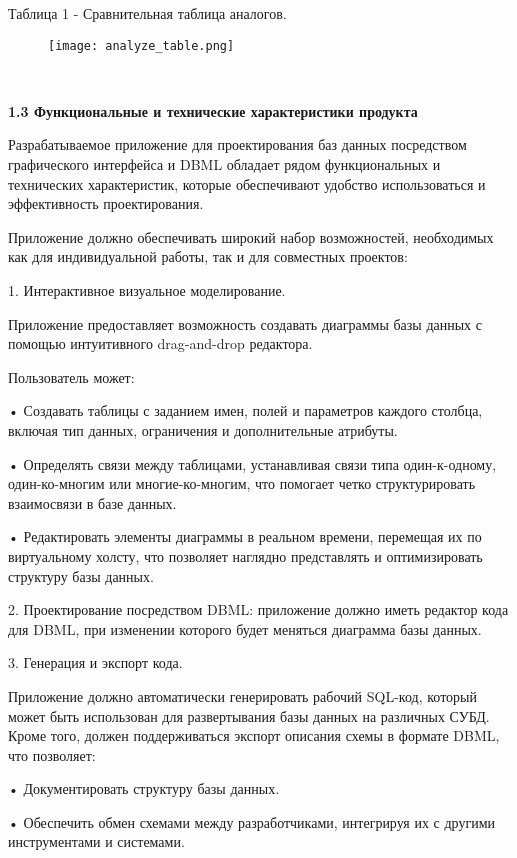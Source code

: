 \newpage
Таблица 1 - Сравнительная таблица аналогов.
\begin{figure}[htbp]
    \centering 
    \texttt{[image: analyze\_table.png]} 
\end{figure}

\

\textbf{\large 1.3 Функциональные и технические характеристики продукта}

Разрабатываемое приложение для проектирования баз данных посредством графического интерфейса и DBML обладает рядом функциональных и технических характеристик, которые обеспечивают удобство использоваться и эффективность проектирования.

Приложение должно обеспечивать широкий набор возможностей, необходимых как для индивидуальной работы, так и для совместных проектов:

1. Интерактивное визуальное моделирование.

Приложение предоставляет возможность создавать диаграммы базы данных с помощью интуитивного drag-and-drop редактора.

Пользователь может:

• Создавать таблицы с заданием имен, полей и параметров каждого столбца, включая тип данных, ограничения и дополнительные атрибуты.

• Определять связи между таблицами, устанавливая связи типа один-к-одному, один-ко-многим или многие-ко-многим, что помогает четко структурировать взаимосвязи в базе данных.

• Редактировать элементы диаграммы в реальном времени, перемещая их по виртуальному холсту, что позволяет наглядно представлять и оптимизировать структуру базы данных.

2. Проектирование посредством DBML: приложение должно иметь редактор кода для DBML, при изменении которого будет меняться диаграмма базы данных.

3. Генерация и экспорт кода.

Приложение должно автоматически генерировать рабочий SQL-код, который может быть использован для развертывания базы данных на различных СУБД. Кроме того, должен поддерживаться экспорт описания схемы в формате DBML, что позволяет:

• Документировать структуру базы данных.

• Обеспечить обмен схемами между разработчиками, интегрируя их с другими инструментами и системами.


